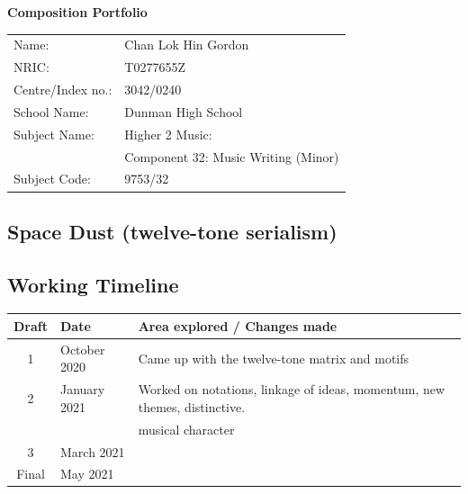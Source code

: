 \documentclass{article}
\begin{document}
\begin{center}
\vspace*{\fill}
\LARGE
    {\bf Composition Portfolio}
\vspace*{\fill}
%
\end{center}
\begin{center}
    \large
\begin{tabular}{ll}
    Name: &Chan Lok Hin Gordon\\
    NRIC: &T0277655Z\\
    Centre/Index no.: &3042/0240\\
    School Name: &Dunman High School\\
    Subject Name: &Higher 2 Music:\\
    &Component 32: Music Writing (Minor)\\
    Subject Code: &9753/32
\end{tabular}
\end{center}

\newpage

\tableofcontents

\newpage

\begin{center}
\vspace*{\fill}
\LARGE
    \section{Space Dust (twelve-tone serialism)}
\vspace*{\fill}
%
\end{center}

\newpage

\subsection{Working Timeline}
\begin{center}
	\def\arraystretch{1.5}
\begin{tabular}{|c|l|l|}
	\hline
	Draft&Date&Area explored / Changes made\\
	\hline
	1&October 2020&
    Came up with the twelve-tone matrix and motifs\\
	\hline
	2&January 2021&
    Worked on notations, linkage of ideas, momentum, new themes, distinctive.\\
    &&musical character\\
	\hline
	3&March 2021&\\
	\hline
	Final&May 2021&\\
	\hline
\end{tabular}
\end{center}
\end{document}
